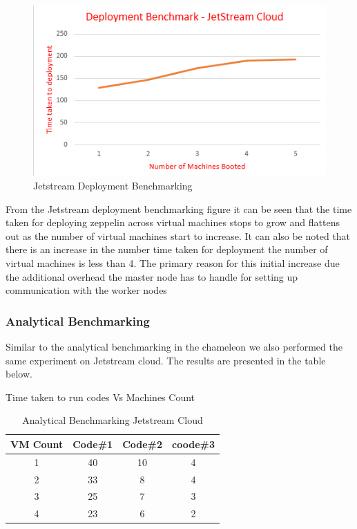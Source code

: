 \documentclass[9pt,twocolumn,twoside]{../../styles/osajnl}
\begin{document}
\begin{figure}
	\includegraphics[width=\linewidth]{./images/jetstream_deployment_time}
	\caption{Jetstream Deployment Benchmarking}
	\label{fig:Jetstream Deployment Benchmarking}
\end{figure}

From the Jetstream deployment benchmarking figure it can be seen that 
the time taken for deploying zeppelin across virtual machines stops 
to grow and flattens out as the number of virtual machines start to 
increase. It can also be noted that there is an increase in the 
number time taken for deployment the number of virtual machines is 
less than 4. The primary reason for this initial increase due the 
additional overhead the master node has to handle for setting up 
communication with the worker nodes

\subsubsection{Analytical Benchmarking}

Similar to the analytical benchmarking in the chameleon we also 
performed the same experiment on Jetstream cloud. The results are 
presented in the table below.

\begin{table}[ht]
	\caption{Analytical Benchmarking Jetstream Cloud} %
	\centering %
	Time taken to run codes Vs Machines Count \\
	\begin{tabular}{c c c c} %
		\hline
		\hline %
		VM Count & Code\#1 & Code\#2 & coode\#3 \\ [0.5ex] %
		\hline %
		1 & 40 & 10 & 4 \\ %
		2 & 33 & 8 & 4 \\
		3 & 25 & 7 & 3 \\
		4 & 23 & 6 & 2 \\ [1ex] %
		\hline %
	\end{tabular}
	\label{table:nonlin} %
\end{table}
\end{document}
